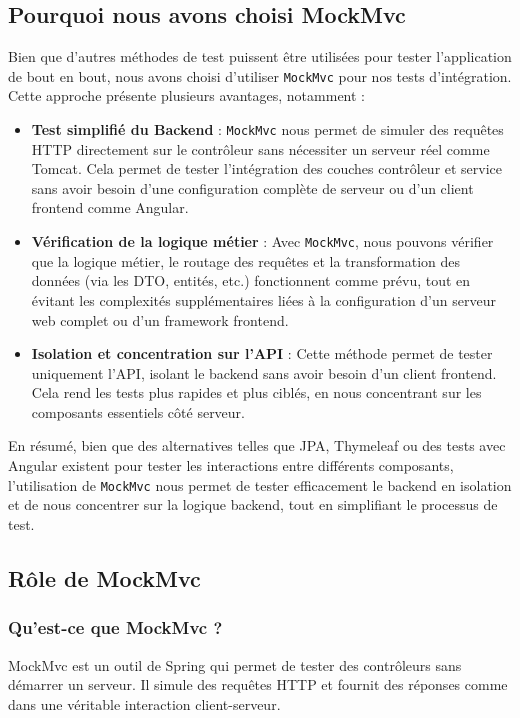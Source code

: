 \documentclass[a4paper,12pt]{article}
\begin{document}
\subsection{Pourquoi nous avons choisi MockMvc}
Bien que d'autres méthodes de test puissent être utilisées pour tester l'application de bout en bout, nous avons choisi d'utiliser \texttt{MockMvc} pour nos tests d'intégration. Cette approche présente plusieurs avantages, notamment :
\begin{itemize}
    \item \textbf{Test simplifié du Backend} : \texttt{MockMvc} nous permet de simuler des requêtes HTTP directement sur le contrôleur sans nécessiter un serveur réel comme Tomcat. Cela permet de tester l'intégration des couches contrôleur et service sans avoir besoin d'une configuration complète de serveur ou d'un client frontend comme Angular.
    \item \textbf{Vérification de la logique métier} : Avec \texttt{MockMvc}, nous pouvons vérifier que la logique métier, le routage des requêtes et la transformation des données (via les DTO, entités, etc.) fonctionnent comme prévu, tout en évitant les complexités supplémentaires liées à la configuration d'un serveur web complet ou d'un framework frontend.
    \item \textbf{Isolation et concentration sur l'API} : Cette méthode permet de tester uniquement l'API, isolant le backend sans avoir besoin d'un client frontend. Cela rend les tests plus rapides et plus ciblés, en nous concentrant sur les composants essentiels côté serveur.
\end{itemize}

En résumé, bien que des alternatives telles que JPA, Thymeleaf ou des tests avec Angular existent pour tester les interactions entre différents composants, l'utilisation de \texttt{MockMvc} nous permet de tester efficacement le backend en isolation et de nous concentrer sur la logique backend, tout en simplifiant le processus de test.

\subsection{Rôle de MockMvc}

\subsubsection{Qu'est-ce que MockMvc ?}
MockMvc est un outil de Spring qui permet de tester des contrôleurs sans démarrer un serveur. Il simule des requêtes HTTP et fournit des réponses comme dans une véritable interaction client-serveur.
\end{document}
